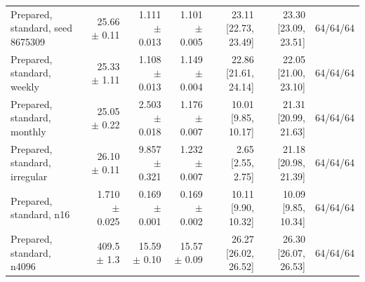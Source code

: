 \begin{tabular}{lrrrrrr}
Prepared, standard, seed 8675309 & 25.66 $\pm$ 0.11 & 1.111 $\pm$ 0.013 & 1.101 $\pm$ 0.005 & 23.11 [22.73, 23.49] & 23.30 [23.09, 23.51] & 64/64/64 \\
Prepared, standard, weekly & 25.33 $\pm$ 1.11 & 1.108 $\pm$ 0.013 & 1.149 $\pm$ 0.004 & 22.86 [21.61, 24.14] & 22.05 [21.00, 23.10] & 64/64/64 \\
Prepared, standard, monthly & 25.05 $\pm$ 0.22 & 2.503 $\pm$ 0.018 & 1.176 $\pm$ 0.007 & 10.01 [9.85, 10.17] & 21.31 [20.99, 21.63] & 64/64/64 \\
Prepared, standard, irregular & 26.10 $\pm$ 0.11 & 9.857 $\pm$ 0.321 & 1.232 $\pm$ 0.007 & 2.65 [2.55, 2.75] & 21.18 [20.98, 21.39] & 64/64/64 \\
Prepared, standard, n16 & 1.710 $\pm$ 0.025 & 0.169 $\pm$ 0.001 & 0.169 $\pm$ 0.002 & 10.11 [9.90, 10.32] & 10.09 [9.85, 10.34] & 64/64/64 \\
Prepared, standard, n4096 & 409.5 $\pm$ 1.3 & 15.59 $\pm$ 0.10 & 15.57 $\pm$ 0.09 & 26.27 [26.02, 26.52] & 26.30 [26.07, 26.53] & 64/64/64 \\
\bottomrule
\end{tabular}
